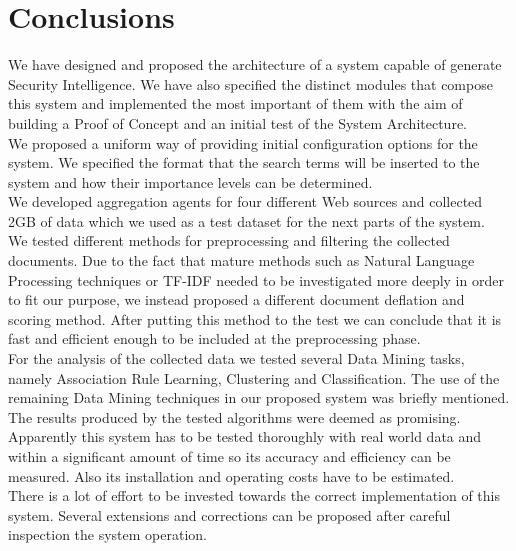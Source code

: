 \documentclass[12pt]{article}
\begin{document}
\newpage
\section{Conclusions}

We have designed and proposed the architecture of a system capable of generate Security Intelligence. We have also specified the distinct modules that compose this system and implemented the most important of them with the aim of building a Proof of Concept and an initial test of the System Architecture. 
\hfill \break\\
We proposed a uniform way of providing initial configuration options for the system. We specified the format that the search terms will be inserted to the system and how their importance levels can be determined. 
\hfill \break\\
We developed aggregation agents for four different Web sources and collected 2GB of data which we used as a test dataset for the next parts of the system. 
\hfill \break\\
We tested different methods for preprocessing and filtering the collected documents. Due to the fact that mature methods such as Natural Language Processing techniques or TF-IDF needed to be investigated more deeply in order to fit our purpose, we instead proposed a different document deflation and scoring method. After putting this method to the test we can conclude that it is fast and efficient enough to be included at the preprocessing phase. 
\hfill \break\\
For the analysis of the collected data we tested several Data Mining tasks, namely Association Rule Learning, Clustering and Classification. The use of the remaining Data Mining techniques in our proposed system was briefly mentioned. The results produced by the tested algorithms were deemed as promising. 
\hfill \break\\
Apparently this system has to be tested thoroughly with real world data and within a significant amount of time so its accuracy and efficiency can be measured. Also its installation and operating costs have to be estimated. 
\hfill \break\\
There is a lot of effort to be invested towards the correct implementation of this system. Several extensions and corrections can be proposed after careful inspection the system operation. 

\newpage
\end{document}
